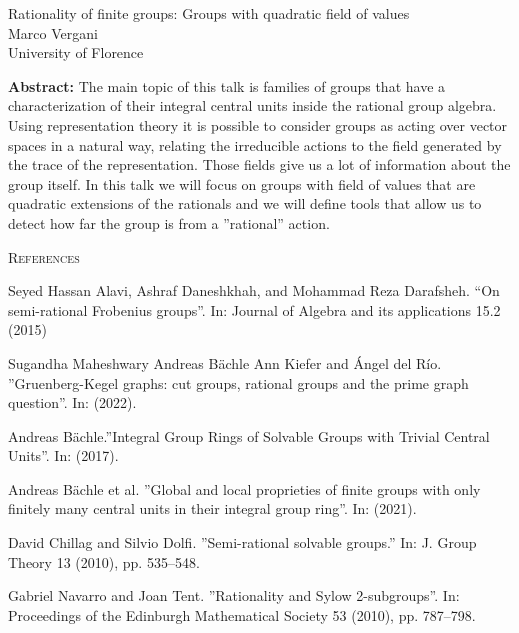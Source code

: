 \documentclass[12pt,a4paper]{article}
\begin{document}
\thispagestyle{empty} 
\begin{center}
{\large  Rationality of finite groups: Groups with quadratic field of values}\\
\vspace*{.5cm}
Marco Vergani\\
University of Florence\\
\end{center}
\vspace*{.8cm}

{\bf Abstract:} The main topic of this talk is families of groups that have a characterization of their integral central units inside the rational group algebra. Using representation theory it is possible to consider groups as acting over vector spaces in a natural way, relating the
irreducible actions to the field generated by the trace of the representation. Those fields give us a lot of information about the group itself. In this talk we will focus on groups with
field of values that are quadratic extensions of the rationals and we will define tools that allow us to detect how far the group is from a ''rational'' action.

\bigskip
\textsc{References}

\begin{enumerate}[label={[\arabic*]}]
\item Seyed Hassan Alavi, Ashraf Daneshkhah, and Mohammad Reza Darafsheh. “On semi-rational Frobenius groups”. In: Journal of Algebra and its applications 15.2 (2015)
\item Sugandha Maheshwary Andreas B\"achle Ann Kiefer and \'Angel del R\'io. ''Gruenberg-Kegel graphs: cut groups, rational groups and the prime graph question''. In: (2022).
\item Andreas B\"achle.''Integral Group Rings of Solvable Groups with Trivial Central Units''. In: (2017).
\item Andreas B\"achle et al. ''Global and local proprieties of finite groups with only finitely many central units in their integral group ring''. In: (2021).
\item David Chillag and Silvio Dolfi. ''Semi-rational solvable groups.'' In: J. Group Theory 13 (2010), pp. 535–548.
\item Gabriel Navarro and Joan Tent. ''Rationality and Sylow 2-subgroups''. In: Proceedings of the Edinburgh Mathematical Society 53 (2010), pp. 787–798.
\end{enumerate} 
\end{document}
